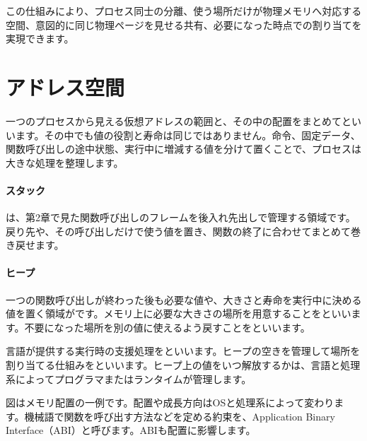         この仕組みにより、プロセス同士の分離、使う場所だけが物理メモリへ対応する空間、意図的に同じ物理ページを見せる共有、必要になった時点での割り当てを実現できます。

\par
\endgroup
  \vspace{3mm}
\par
\endgroup


\section{アドレス空間}
\label{sec:03-runtime-data-05}

一つのプロセスから見える仮想アドレスの範囲と、その中の配置をまとめてといいます。その中でも値の役割と寿命は同じではありません。命令、固定データ、関数呼び出しの途中状態、実行中に増減する値を分けて置くことで、プロセスは大きな処理を整理します。

\begingroup
\begingroup
      \centering
\par
\endgroup
\medskip
\begingroup
\paragraph{スタック}
        は、第2章で見た関数呼び出しのフレームを後入れ先出しで管理する領域です。戻り先や、その呼び出しだけで使う値を置き、関数の終了に合わせてまとめて巻き戻せます。

\paragraph{ヒープ}
        一つの関数呼び出しが終わった後も必要な値や、大きさと寿命を実行中に決める値を置く領域がです。メモリ上に必要な大きさの場所を用意することをといいます。不要になった場所を別の値に使えるよう戻すことをといいます。

        言語が提供する実行時の支援処理をといいます。ヒープの空きを管理して場所を割り当てる仕組みをといいます。ヒープ上の値をいつ解放するかは、言語と処理系によってプログラマまたはランタイムが管理します。

      図はメモリ配置の一例です。配置や成長方向はOSと処理系によって変わります。機械語で関数を呼び出す方法などを定める約束を、Application Binary Interface（ABI）と呼びます。ABIも配置に影響します。
\par
\endgroup
\par
\endgroup


